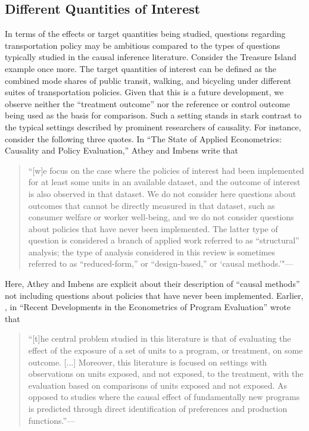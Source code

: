 \subsection{Different Quantities of Interest}
\label{sec:diff_quantities_of_interest}
In terms of the effects or target quantities being studied, questions regarding transportation policy may be ambitious compared to the types of questions typically studied in the causal inference literature. Consider the Treasure Island example once more. The target quantities of interest can be defined as the combined mode shares of public transit, walking, and bicycling under different suites of transportation policies. Given that this is a future development, we observe neither the ``treatment outcome'' nor the reference or control outcome being used as the basis for comparison. Such a setting stands in stark contrast to the typical settings described by prominent researchers of causality. For instance, consider the following three quotes. In ``The State of Applied Econometrics: Causality and Policy Evaluation,'' Athey and Imbens write that
\begin{quotation}
``[w]e focus on the case where the policies of interest had been implemented for at least some units in an available dataset, and the outcome of interest is also observed in that dataset. We do not consider here questions about outcomes that cannot be directly measured in that dataset, such as consumer welfare or worker well-being, and we do not consider questions about policies that have never been implemented. The latter type of question is considered a branch of applied work referred to as ``structural'' analysis; the type of analysis considered in this review is sometimes referred to as ``reduced-form,'' or ``design-based,'' or `causal methods.'"---\citep{athey2016state}
\end{quotation}
Here, Athey and Imbens are explicit about their description of ``causal methods'' not including questions about policies that have never been implemented. Earlier, \citeauthor{imbens2009recent}, in ``Recent Developments in the Econometrics of Program Evaluation'' wrote that
\begin{quotation}
``[t]he central problem studied in this literature is that of evaluating the effect of the exposure of a set of units to a program, or treatment, on some outcome. [...] Moreover, this literature is focused on settings with observations on units exposed, and not exposed, to the treatment, with the evaluation based on comparisons of units exposed and not exposed. As opposed to studies where the causal effect of fundamentally new programs is predicted through direct identification of preferences and production functions.''---\citep{imbens2009recent}
\end{quotation}
